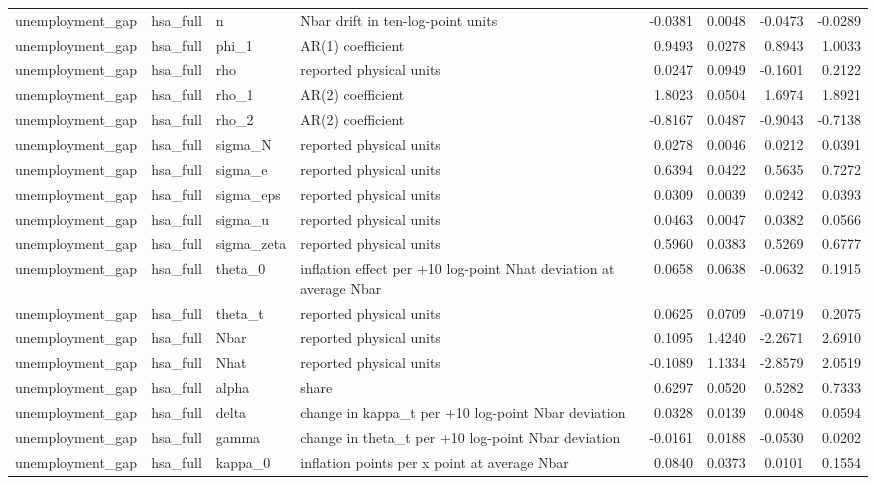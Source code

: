 \begin{tabular}{llllrrrr}
unemployment\_gap & hsa\_full & n & Nbar drift in ten-log-point units & -0.0381 & 0.0048 & -0.0473 & -0.0289 \\
unemployment\_gap & hsa\_full & phi\_1 & AR(1) coefficient & 0.9493 & 0.0278 & 0.8943 & 1.0033 \\
unemployment\_gap & hsa\_full & rho & reported physical units & 0.0247 & 0.0949 & -0.1601 & 0.2122 \\
unemployment\_gap & hsa\_full & rho\_1 & AR(2) coefficient & 1.8023 & 0.0504 & 1.6974 & 1.8921 \\
unemployment\_gap & hsa\_full & rho\_2 & AR(2) coefficient & -0.8167 & 0.0487 & -0.9043 & -0.7138 \\
unemployment\_gap & hsa\_full & sigma\_N & reported physical units & 0.0278 & 0.0046 & 0.0212 & 0.0391 \\
unemployment\_gap & hsa\_full & sigma\_e & reported physical units & 0.6394 & 0.0422 & 0.5635 & 0.7272 \\
unemployment\_gap & hsa\_full & sigma\_eps & reported physical units & 0.0309 & 0.0039 & 0.0242 & 0.0393 \\
unemployment\_gap & hsa\_full & sigma\_u & reported physical units & 0.0463 & 0.0047 & 0.0382 & 0.0566 \\
unemployment\_gap & hsa\_full & sigma\_zeta & reported physical units & 0.5960 & 0.0383 & 0.5269 & 0.6777 \\
unemployment\_gap & hsa\_full & theta\_0 & inflation effect per +10 log-point Nhat deviation at average Nbar & 0.0658 & 0.0638 & -0.0632 & 0.1915 \\
unemployment\_gap & hsa\_full & theta\_t & reported physical units & 0.0625 & 0.0709 & -0.0719 & 0.2075 \\
unemployment\_gap & hsa\_full & Nbar & reported physical units & 0.1095 & 1.4240 & -2.2671 & 2.6910 \\
unemployment\_gap & hsa\_full & Nhat & reported physical units & -0.1089 & 1.1334 & -2.8579 & 2.0519 \\
unemployment\_gap & hsa\_full & alpha & share & 0.6297 & 0.0520 & 0.5282 & 0.7333 \\
unemployment\_gap & hsa\_full & delta & change in kappa\_t per +10 log-point Nbar deviation & 0.0328 & 0.0139 & 0.0048 & 0.0594 \\
unemployment\_gap & hsa\_full & gamma & change in theta\_t per +10 log-point Nbar deviation & -0.0161 & 0.0188 & -0.0530 & 0.0202 \\
unemployment\_gap & hsa\_full & kappa\_0 & inflation points per x point at average Nbar & 0.0840 & 0.0373 & 0.0101 & 0.1554 \\

\end{tabular}
